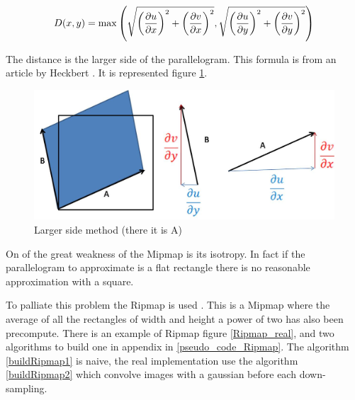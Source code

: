 



$$ D(x,y) = \max \left(\sqrt{\left(\frac{\partial u}{\partial x}\right)^2 + \left(\frac{\partial v}{\partial x}\right)^2},\sqrt{\left(\frac{\partial u}{\partial y}\right)^2 + \left(\frac{\partial v}{\partial y}\right)^2}\right)$$

The distance is the larger side of the parallelogram. This formula is from an article by Heckbert \cite{heckbert1983texture}. It is represented figure \ref{methode_plus_grand_cote}.


\begin{figure}[h!]
\centering
\includegraphics[scale=0.5]{methode_plus_grand_cote.jpg}
\caption{Larger side method (there it is A)}
\label{methode_plus_grand_cote}
\end{figure}


\label{Ripmap}

On of the great weakness of the Mipmap is its isotropy. In fact if the parallelogram to approximate is a flat rectangle there is no reasonable approximation with a square.

To palliate this problem the Ripmap is used \cite{akenine2008real}. This is a Mipmap where the average  of all the rectangles of width and height a power of two has also been precompute. There is an example of Ripmap figure \ref{Ripmap_real}, and two algorithms to build one in appendix in \ref{pseudo_code_Ripmap}. The algorithm \ref{buildRipmap1} is naive, the real implementation use the algorithm \ref{buildRipmap2} which convolve images with a gaussian before each down-sampling.


